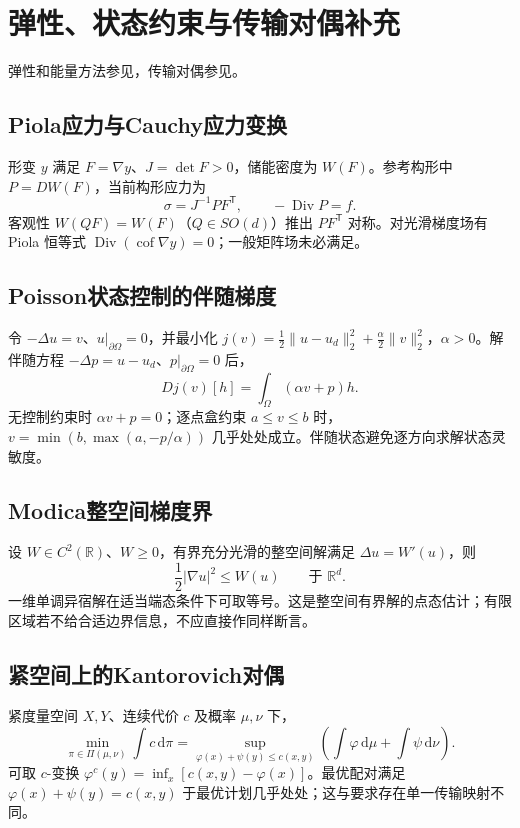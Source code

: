 \documentclass[../main.tex]{subfiles}
\begin{document}
\section{弹性、状态约束与传输对偶补充}
弹性和能量方法参见\cite{variation}，传输对偶参见\cite{villani}。
\subsection{Piola应力与Cauchy应力变换}
形变 $y$ 满足 $F=\nabla y$、$J=\det F>0$，储能密度为 $W(F)$。参考构形中 $P=DW(F)$，当前构形应力为
\[
\sigma=J^{-1}PF^{\mathsf T},\qquad -\operatorname{Div}P=f.
\]
客观性 $W(QF)=W(F)$（$Q\in SO(d)$）推出 $PF^{\mathsf T}$ 对称。对光滑梯度场有 Piola 恒等式 $\operatorname{Div}(\operatorname{cof}\nabla y)=0$；一般矩阵场未必满足。
\subsection{Poisson状态控制的伴随梯度}
令 $-\Delta u=v$、$u|_{\partial\Omega}=0$，并最小化 $j(v)=\tfrac12\|u-u_d\|_2^2+\tfrac\alpha2\|v\|_2^2$，$\alpha>0$。解伴随方程 $-\Delta p=u-u_d$、$p|_{\partial\Omega}=0$ 后，
\[
Dj(v)[h]=\int_\Omega(\alpha v+p)h.
\]
无控制约束时 $\alpha v+p=0$；逐点盒约束 $a\le v\le b$ 时，$v=\min(b,\max(a,-p/\alpha))$ 几乎处处成立。伴随状态避免逐方向求解状态灵敏度。
\subsection{Modica整空间梯度界}
设 $W\in C^2(\mathbb R)$、$W\ge0$，有界充分光滑的整空间解满足 $\Delta u=W'(u)$，则
\[
\frac12|\nabla u|^2\le W(u)\qquad\text{于 }\mathbb R^d.
\]
一维单调异宿解在适当端态条件下可取等号。这是整空间有界解的点态估计；有限区域若不给合适边界信息，不应直接作同样断言。
\subsection{紧空间上的Kantorovich对偶}
紧度量空间 $X,Y$、连续代价 $c$ 及概率 $\mu,\nu$ 下，
\[
\min_{\pi\in\Pi(\mu,\nu)}\int c\,\mathrm d\pi
=\sup_{\varphi(x)+\psi(y)\le c(x,y)}
\left(\int\varphi\,\mathrm d\mu+\int\psi\,\mathrm d\nu\right).
\]
可取 $c$-变换 $\varphi^c(y)=\inf_x[c(x,y)-\varphi(x)]$。最优配对满足 $\varphi(x)+\psi(y)=c(x,y)$ 于最优计划几乎处处；这与要求存在单一传输映射不同。
\clearpage
\end{document}
